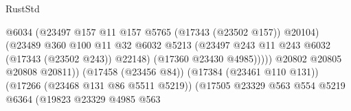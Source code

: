 \begin{lexlean}{RustStd}
\begin{coremodule}
                                                          @6034
                                                          (@23497
                                                            @157
                                                            @11
                                                            @157
                                                            @5765
                                                            (@17343 (@23502 @157))
                                                            @20104)
                                                          (@23489
                                                            @360
                                                            @100
                                                            @11
                                                            @32
                                                            @6032
                                                            @5213
                                                            (@23497
                                                              @243
                                                              @11
                                                              @243
                                                              @6032
                                                              (@17343 (@23502 @243))
                                                              @22148)
                                                            (@17360 @23430 @4985)))))
                                                    @20802
                                                    @20805
                                                    @20808
                                                    @20811))
                                                (@17458 (@23456 @84))
                                                (@17384 (@23461 @110 @131))
                                                (@17266 (@23468 @131 @86 @5511 @5219))
                                                (@17505
                                                  @23329
                                                  @563
                                                  @554
                                                  @5219
                                                  @6364
                                                  (@19823
                                                    @23329
                                                    @4985
                                                    @563

\end{coremodule}
\end{lexlean}
